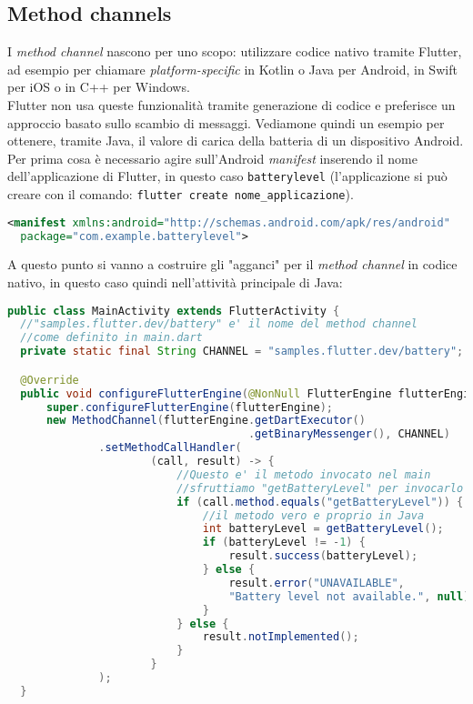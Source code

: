\begin{appendices}
\section{Method channels}
I \textit{method channel} nascono per uno scopo: utilizzare codice nativo tramite Flutter, ad esempio per chiamare \api{} \textit{platform-specific} in Kotlin o Java per Android, in Swift per iOS o in C++ per Windows.\\
Flutter non usa queste funzionalità tramite generazione di codice e preferisce un approccio basato sullo scambio di messaggi. Vediamone quindi un esempio per ottenere, tramite Java, il valore di carica della batteria di un dispositivo Android.\\
Per prima cosa è necessario agire sull'Android \textit{manifest} inserendo il nome dell'applicazione di Flutter, in questo caso \verb+batterylevel+ (l'applicazione si può creare con il comando: \verb+flutter create nome_applicazione+).

\begin{lstlisting}[language=XML, firstnumber=1,caption={Android \textit{manifest}}]
<manifest xmlns:android="http://schemas.android.com/apk/res/android"
  package="com.example.batterylevel">
\end{lstlisting}

A questo punto si vanno a costruire gli "agganci" per il \textit{method channel} in codice nativo, in questo caso quindi nell'attività principale di Java:

\begin{lstlisting}[language=Java, firstnumber=1,caption={Java \textit{main activity}}]
public class MainActivity extends FlutterActivity {
  //"samples.flutter.dev/battery" e' il nome del method channel
  //come definito in main.dart
  private static final String CHANNEL = "samples.flutter.dev/battery";

  @Override
  public void configureFlutterEngine(@NonNull FlutterEngine flutterEngine) {
      super.configureFlutterEngine(flutterEngine);
      new MethodChannel(flutterEngine.getDartExecutor()
                                     .getBinaryMessenger(), CHANNEL)
              .setMethodCallHandler(
                      (call, result) -> {
                          //Questo e' il metodo invocato nel main
                          //sfruttiamo "getBatteryLevel" per invocarlo
                          if (call.method.equals("getBatteryLevel")) {
                              //il metodo vero e proprio in Java
                              int batteryLevel = getBatteryLevel();
                              if (batteryLevel != -1) {
                                  result.success(batteryLevel);
                              } else {
                                  result.error("UNAVAILABLE", 
                                  "Battery level not available.", null);
                              }
                          } else {
                              result.notImplemented();
                          }
                      }
              );
  }


\end{lstlisting}
\end{appendices}
